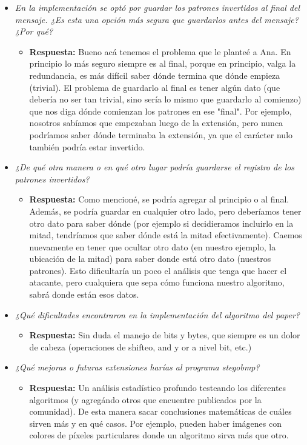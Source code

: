\documentclass[a4paper,12pt]{article}
\begin{document}
\begin{itemize}
		\item \textit{En la implementación se optó por guardar los patrones invertidos al final del mensaje. ¿Es esta una opción más segura que guardarlos antes del mensaje? ¿Por qué?}
		\begin{itemize}
			\item \textbf{Respuesta:} Bueno acá tenemos el problema que le planteé a Ana. En principio lo más seguro siempre es al final, porque en principio, valga la redundancia, es más difícil saber dónde termina que dónde empieza (trivial). El problema de guardarlo al final es tener algún dato (que debería no ser tan trivial, sino sería lo mismo que guardarlo al comienzo) que nos diga dónde comienzan los patrones en ese "final". Por ejemplo, nosotros sabíamos que empezaban luego de la extensión, pero nunca podríamos saber dónde terminaba la extensión, ya que el carácter nulo también podría estar invertido.
		\end{itemize}
		
		\item \textit{¿De qué otra manera o en qué otro lugar podría guardarse el registro de los patrones invertidos?}
		\begin{itemize}
			\item \textbf{Respuesta:} Como mencioné, se podría agregar al principio o al final. Además, se podría guardar en cualquier otro lado, pero deberíamos tener otro dato para saber dónde (por ejemplo si decidieramos incluirlo en la mitad, tendríamos que saber dónde está la mitad efectivamente). Caemos nuevamente en tener que ocultar otro dato (en nuestro ejemplo, la ubicación de la mitad) para saber donde está otro dato (nuestros patrones). Esto dificultaría un poco el análisis que tenga que hacer el atacante, pero cualquiera que sepa cómo funciona nuestro algoritmo, sabrá donde están esos datos.
		\end{itemize}
		
		\item \textit{¿Qué dificultades encontraron en la implementación del algoritmo del paper?}
		\begin{itemize}
			\item \textbf{Respuesta:} Sin duda el manejo de bits y bytes, que siempre es un dolor de cabeza (operaciones de shifteo, and y or a nivel bit, etc.)
		\end{itemize}
		
		\item \textit{¿Qué mejoras o futuras extensiones harías al programa stegobmp?}
		\begin{itemize}
			\item \textbf{Respuesta:} Un análisis estadístico profundo testeando los diferentes algoritmos (y agregándo otros que encuentre publicados por la comunidad). De esta manera sacar conclusiones matemáticas de cuáles sirven más y en qué casos. Por ejemplo, pueden haber imágenes con colores de píxeles particulares donde un algoritmo sirva más que otro.
		\end{itemize}
	\end{itemize}
	
\end{document}
